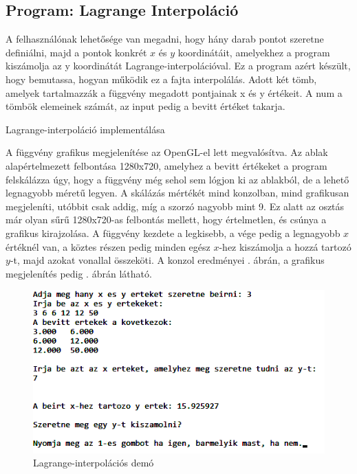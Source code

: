 \subsection{Program: Lagrange Interpoláció}

A felhasználónak lehetősége van megadni, hogy hány darab pontot szeretne definiálni, majd a pontok konkrét $x$ és $y$ koordinátáit, amelyekhez a program kiszámolja az y koordinátát Lagrange-interpolációval. Ez a program azért készült, hogy bemutassa, hogyan működik ez a fajta interpolálás.
Adott két tömb, amelyek tartalmazzák a függvény megadott pontjainak x és y értékeit. A num a tömbök elemeinek számát, az input pedig a bevitt értéket takarja.

\begin{algorithm}[H]
 \caption{Lagrange-interpoláció implementálása}
\end{algorithm} 

A függvény grafikus megjelenítése az OpenGL-el lett megvalósítva. Az ablak alapértelmezett felbontása 1280x720, amelyhez a bevitt értékeket a program felskálázza úgy, hogy a függvény még sehol sem lógjon ki az ablakból, de a lehető legnagyobb méretű legyen. A skálázás mértékét mind konzolban, mind grafikusan megjeleníti, utóbbit csak addig, míg a szorzó nagyobb mint 9. Ez alatt az osztás már olyan sűrű 1280x720-as felbontás mellett, hogy értelmetlen, és csúnya a grafikus kirajzolása. 
\newpage
A függvény kezdete a legkisebb, a vége pedig a legnagyobb $x$ értéknél van, a köztes részen pedig minden egész $x$-hez kiszámolja a hozzá tartozó $y$-t, majd azokat vonallal összeköti. A konzol eredményei . ábrán, a grafikus megjelenítés pedig . ábrán látható.

\begin{figure}[h]
\centering
\includegraphics[scale=0.9]{kepek/lagrange_imp.png}
\caption{Lagrange-interpolációs demó}
\label{fig:lagrange_imp}
\end{figure}

